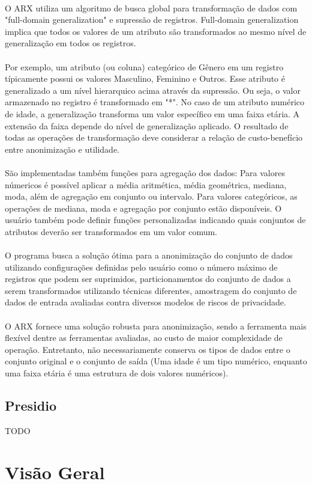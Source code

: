 \paragraph{} O ARX utiliza um algoritmo de busca global para transformação de dados com "full-domain generalization" e supressão de registros. Full-domain generalization implica que todos os  valores de um atributo são transformados ao mesmo nível de generalização em todos os registros.

\paragraph{} Por exemplo, um atributo (ou coluna) categórico de Gênero em um registro típicamente possui os valores Masculino, Feminino e Outros. Esse atributo é generalizado a um nível hierarquico acima através da supressão. Ou seja, o valor armazenado no registro é transformado em "*". No caso de um atributo numérico de idade, a generalização transforma um valor específico em uma faixa etária. A extensão da faixa depende do nível de generalização aplicado. O resultado de todas as operações de transformação deve considerar a relação de custo-benefício entre anonimização e utilidade.

\paragraph{} São implementadas também funções para agregação dos dados: Para valores númericos é possível aplicar a média aritmética, média geométrica, mediana, moda, além de agregação em conjunto ou intervalo. Para valores categóricos, as operações de mediana, moda e agregação por conjunto estão disponíveis. O usuário também pode definir funções personalizadas indicando quais conjuntos de atributos deverão ser transformados em um valor comum.

\paragraph{} O programa busca a solução ótima para a anonimização do conjunto de dados utilizando configurações definidas pelo usuário como o número máximo de registros que podem ser suprimidos, particionamentos do conjunto de dados a serem transformados utilizando técnicas diferentes, amostragem do conjunto de dados de entrada avaliadas contra diversos modelos de riscos de privacidade.

\paragraph{} O ARX fornece uma solução robusta para anonimização, sendo a ferramenta mais flexível dentre as ferramentas avaliadas, ao custo de maior complexidade de operação. Entretanto, não necessariamente conserva os tipos de dados entre o conjunto original e o conjunto de saída (Uma idade é um tipo numérico, enquanto uma faixa etária é uma estrutura de dois valores numéricos).

\subsection{Presidio}

\cite{presidio}

TODO

\section{Visão Geral}
